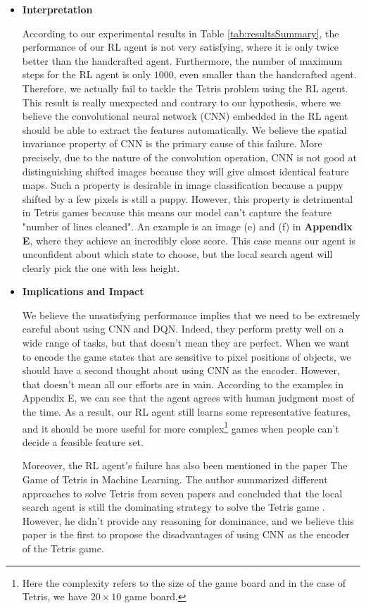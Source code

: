 \documentclass[letterpaper]{article} %
\begin{document}
\begin{itemize}
  \item \textbf{Interpretation}
   
  According to our experimental results in Table \ref{tab:resultsSummary}, the performance of our RL agent is not very satisfying, where it is only twice better than the handcrafted agent. Furthermore, the number of maximum steps for the RL agent is only $1000$, even smaller than the handcrafted agent. Therefore, we actually fail to tackle the Tetris problem using the RL agent. This result is really unexpected and contrary to our hypothesis, where we believe the convolutional neural network (CNN) embedded in the RL agent should be able to extract the features automatically. We believe the spatial invariance property of CNN is the primary cause of this failure. More precisely, due to the nature of the convolution operation, CNN is not good at distinguishing shifted images because they will give almost identical feature maps. Such a property is desirable in image classification because a puppy shifted by a few pixels is still a puppy. However, this property is detrimental in Tetris games because this means our model can't capture the feature "number of lines cleaned". An example is an image (e) and (f) in \textbf{Appendix E}, where they achieve an incredibly close score. This case means our agent is unconfident about which state to choose, but the local search agent will clearly pick the one with less height.
  
  \item \textbf{Implications and Impact}
  
  We believe the unsatisfying performance implies that we need to be extremely careful about using CNN and DQN. Indeed, they perform pretty well on a wide range of tasks, but that doesn't mean they are perfect. When we want to encode the game states that are sensitive to pixel positions of objects, we should have a second thought about using CNN as the encoder. However, that doesn't mean all our efforts are in vain. According to the examples in Appendix E, we can see that the agent agrees with human judgment most of the time. As a result, our RL agent still learns some representative features, and it should be more useful for more complex\footnote{Here the complexity refers to the size of the game board and in the case of Tetris, we have $20\times 10$ game board.} games when people can't decide a feasible feature set.
  
  Moreover, the RL agent's failure has also been mentioned in the paper The Game of Tetris in Machine Learning. The author summarized different approaches to solve Tetris from seven papers and concluded that the local search agent is still the dominating strategy to solve the Tetris game \cite{SO19}. However, he didn't provide any reasoning for dominance, and we believe this paper is the first to propose the disadvantages of using CNN as the encoder of the Tetris game.
  

\end{itemize}
\end{document}
